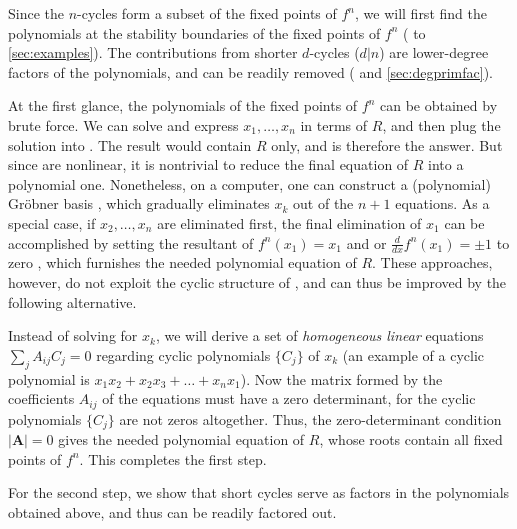 \documentclass[twocolumn]{revtex4-1}
\begin{document}
Since the $n$-cycles form a subset of the fixed points of $f^n$,
we will first find
  the polynomials at the stability boundaries of
  the fixed points of $f^n$
  ( to \ref{sec:examples}).
The contributions from shorter $d$-cycles ($d|n$)
  are lower-degree factors of the polynomials,
  and can be readily removed
  ( and \ref{sec:degprimfac}).

At the first glance, the polynomials of the fixed points of $f^n$
  can be obtained by brute force.
We can solve
   and express $x_1, \ldots, x_n$
  in terms of $R$,
  and then plug the solution into .
The result would contain $R$ only,
  and is therefore the answer.
But since  are nonlinear,
  it is nontrivial to reduce the final equation of $R$
  into a polynomial one.
Nonetheless, on a computer, one can
  construct a (polynomial) Gr\"obner basis \cite{kk1},
  which gradually eliminates $x_k$ out of the $n+1$ equations.
As a special case, if $x_2, \dots, x_n$ are eliminated first,
  the final elimination of $x_1$ can be accomplished
  by setting the resultant of $f^n(x_1) = x_1$ and
   or $\frac{d}{dx}f^n (x_1) = \pm 1$
  to zero \cite{burm},
  which furnishes the needed polynomial equation of $R$.
%
These approaches, however, do not
  exploit the cyclic structure of ,
  and can thus be improved by the following alternative.


Instead of solving  for $x_k$,
  we will derive a set of \emph{homogeneous linear} equations
  $\sum_j A_{ij} C_j = 0$
  regarding cyclic polynomials $\{C_j\}$ of $x_k$
  (an example of a cyclic polynomial is $x_1 x_2 + x_2 x_3 + \dots + x_n x_1$).
%
Now the matrix formed by the coefficients $A_{ij}$ of the equations
  must have a zero determinant,
  for the cyclic polynomials $\{C_j\}$ are not zeros altogether.
%
Thus, the zero-determinant condition $|\mathbf A| = 0$ gives
  the needed polynomial equation of $R$,
whose roots contain all fixed points of $f^n$.
This completes the first step.
%
%


For the second step,
we show
that short cycles serve as
factors in the polynomials obtained above,
and thus can be readily factored out.
\end{document}
